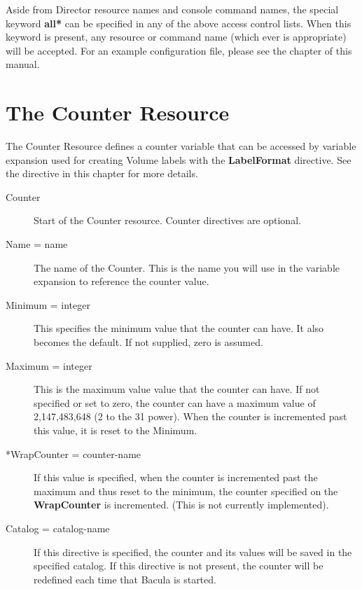 Aside from Director resource names and console command names, the special
keyword {\bf *all*} can be specified in any of the above access control lists.
When this keyword is present, any resource or command name (which ever is
appropriate) will be accepted. For an example configuration file, please see
the 
 chapter of this
manual. 

\section{The Counter Resource}
\label{CounterResource}

The Counter Resource defines a counter variable that can be accessed by
variable expansion used for creating Volume labels with the {\bf LabelFormat}
directive. See the 
 directive in this chapter for more
details. 

\begin{description}

\item [Counter] 
   Start of the Counter resource.  Counter directives are optional. 

\item [Name = \lt{}name\gt{}]
   The name of the Counter.  This is the name you will use in the variable
expansion  to reference the counter value.  

\item [Minimum = \lt{}integer\gt{}]
   This specifies the minimum  value that the counter can have. It also becomes
the default.  If not supplied, zero is assumed.  

\item [Maximum = \lt{}integer\gt{}]
   This is the maximum value  value that the counter can have. If not specified
or set to  zero, the counter can have a maximum value of 2,147,483,648  (2 to
the 31 power). When the counter is incremented past  this value, it is reset
to the Minimum.  

\item [*WrapCounter = \lt{}counter-name\gt{}]
   If this value  is specified, when the counter is incremented past the
maximum 
and thus reset to the minimum, the counter specified on the  {\bf WrapCounter}
is incremented. (This is not currently  implemented). 

\item [Catalog = \lt{}catalog-name\gt{}]
   If this directive is  specified, the counter and its values will be saved in 
the specified catalog. If this directive is not present, the  counter will be
redefined each time that Bacula is started. 
\end{description}

